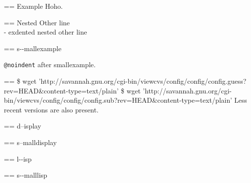 \documentclass{book}
\makeatletter
\newenvironment{GNUTexinfopreformatted}{%
  \par\GNUTobeylines\obeyspaces\frenchspacing
  \parskip=\z@\parindent=\z@}{}
{\catcode`\^^M=13 \gdef\GNUTobeylines{\catcode`\^^M=13 \def^^M{\null\par}}}
\newenvironment{GNUTexinfoindented}
  {\begin{list}{}{}
  \item\relax}
  {\end{list}}
\makeatother
\begin{document}
\begin{titlepage}
\begin{GNUTexinfoindented}
\begin{GNUTexinfopreformatted}%
\ttfamily Example   Hoho.
\end{GNUTexinfopreformatted}
\begin{GNUTexinfoindented}
\begin{GNUTexinfopreformatted}%
\ttfamily Nested Other line
\end{GNUTexinfopreformatted}
\leavevmode{}\\
\hbox{\kern -\leftmargin}%
exdented nested other line
\\
\end{GNUTexinfoindented}
\end{GNUTexinfoindented}

\begin{GNUTexinfopreformatted}%
\ttfamily \footnotesize s{-}{-}mallexample
\end{GNUTexinfopreformatted}

\texttt{@noindent} after smallexample.
\begin{GNUTexinfopreformatted}%
\ttfamily \footnotesize \$ wget 'http://savannah.gnu.org/cgi-bin/viewcvs/config/config/config.guess?rev=HEAD\&content-type=text/plain'
\$ wget 'http://savannah.gnu.org/cgi-bin/viewcvs/config/config/config.sub?rev=HEAD\&content-type=text/plain'
\end{GNUTexinfopreformatted}
\noindent{}Less recent versions are also present.

\begin{GNUTexinfoindented}
\begin{GNUTexinfopreformatted}%
d--isplay
\end{GNUTexinfopreformatted}
\end{GNUTexinfoindented}

\begin{GNUTexinfopreformatted}%
\footnotesize s--malldisplay
\end{GNUTexinfopreformatted}

\begin{GNUTexinfoindented}
\begin{GNUTexinfopreformatted}%
\ttfamily l{-}{-}isp
\end{GNUTexinfopreformatted}
\end{GNUTexinfoindented}

\begin{GNUTexinfopreformatted}%
\ttfamily \footnotesize s{-}{-}malllisp
\end{GNUTexinfopreformatted}


\end{titlepage}
\end{document}
